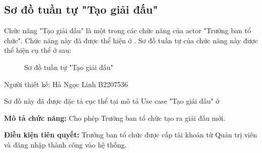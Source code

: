 \subsection{Sơ đồ tuần tự "Tạo giải đấu"}
\setcounter{figure}{0}

Chức năng "Tạo giải đấu" là một trong các chức năng của actor "Trưởng ban tổ chức".
Chức năng này đã được thể hiện ở .
Sơ đồ tuần tự của chức năng này được thể hiện cụ thể ở  sau:

\begin{figure}[H]
      \centering
      
      \caption{Sơ đồ tuần tự "Tạo giải đấu"}
      \label{fig:sd-1}
\end{figure}

Người thiết kế: Hà Ngọc Linh B2207536

Sơ đồ này đã được đặc tả cục thể tại mô tả Use case "Tạo giải đấu" ở

\noindent
\textbf{Mô tả chức năng:} Cho phép Trưởng ban tổ chức tạo ra giải đấu mới.

\noindent
\textbf{Điều kiện tiên quyết:} Trưởng ban tổ chức được cấp tài khoản từ Quản trị viên và đăng nhập thành công vào hệ thống.

